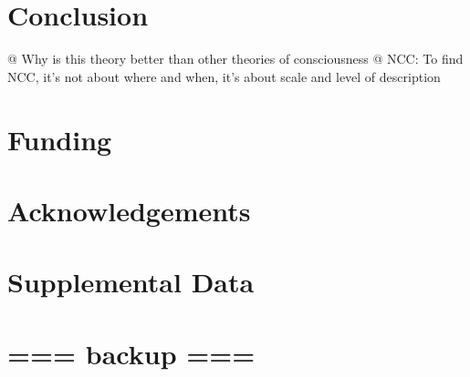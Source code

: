 \documentclass[utf8]{article}
\newenvironment{ants}
			{
			 \begin{easylist}[itemize]		
		 	}
			{
			\end{easylist}
			}
\begin{document}
		

	\section{Conclusion}
		\begin{ants}
			@ Why is this theory better than other theories of consciousness
			@ NCC: To find NCC, it's not about where and when, it's about scale and level of description			 
		\end{ants}

	
	
	
	\section*{Funding}
	
	\section*{Acknowledgements}
	
	\section*{Supplemental Data}
	
	
	
	
	\section*{=== backup ===}	
\end{document}
